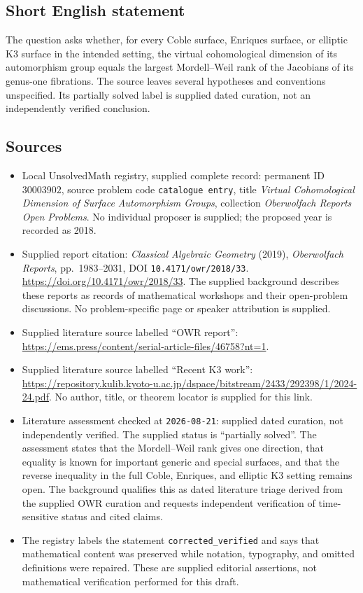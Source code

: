 \documentclass[11pt]{article}
\begin{document}
\subsection{Short English statement}
The question asks whether, for every Coble surface, Enriques surface, or elliptic K3 surface in the intended setting, the virtual cohomological dimension of its automorphism group equals the largest Mordell--Weil rank of the Jacobians of its genus-one fibrations. The source leaves several hypotheses and conventions unspecified. Its partially solved label is supplied dated curation, not an independently verified conclusion.
\subsection{Sources}
\begin{itemize}
\item Local UnsolvedMath registry, supplied complete record: permanent ID \(30003902\), source problem code \texttt{catalogue entry}, title \emph{Virtual Cohomological Dimension of Surface Automorphism Groups}, collection \emph{Oberwolfach Reports Open Problems}. No individual proposer is supplied; the proposed year is recorded as 2018.
\item Supplied report citation: \emph{Classical Algebraic Geometry} (2019), \emph{Oberwolfach Reports}, pp.\ 1983--2031, DOI \texttt{10.4171/owr/2018/33}. \url{https://doi.org/10.4171/owr/2018/33}. The supplied background describes these reports as records of mathematical workshops and their open-problem discussions. No problem-specific page or speaker attribution is supplied.
\item Supplied literature source labelled ``OWR report'': \url{https://ems.press/content/serial-article-files/46758?nt=1}.
\item Supplied literature source labelled ``Recent K3 work'': \url{https://repository.kulib.kyoto-u.ac.jp/dspace/bitstream/2433/292398/1/2024-24.pdf}. No author, title, or theorem locator is supplied for this link.
\item Literature assessment checked at \texttt{2026-08-21}: supplied dated curation, not independently verified. The supplied status is ``partially solved''. The assessment states that the Mordell--Weil rank gives one direction, that equality is known for important generic and special surfaces, and that the reverse inequality in the full Coble, Enriques, and elliptic K3 setting remains open. The background qualifies this as dated literature triage derived from the supplied OWR curation and requests independent verification of time-sensitive status and cited claims.
\item The registry labels the statement \texttt{corrected\_verified} and says that mathematical content was preserved while notation, typography, and omitted definitions were repaired. These are supplied editorial assertions, not mathematical verification performed for this draft.
\end{itemize}
\end{document}
